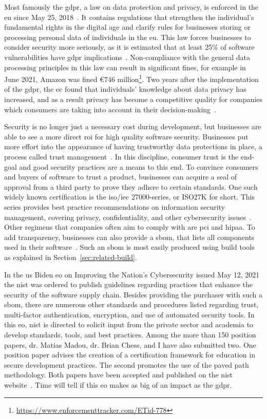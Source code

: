 Most famously the \gls{gdpr}, a law on data protection and privacy, is enforced in the \gls{eu} since May 25, 2018~\cite{gdpr}.
It contains regulations that strengthen the individual's fundamental rights in the digital age and clarify rules for businesses storing or processing personal data of individuals in the \gls{eu}.
This law forces businesses to consider security more seriously, as it is estimated that at least 25\% of software vulnerabilities have \gls{gdpr} implications~\cite{gdprhackerone}.
Non-compliance with the general data processing principles in this law can result in significant fines, for example in June 2021, Amazon was fined €746 million\footnote{\url{https://www.enforcementtracker.com/ETid-778}}.
Two years after the implementation of the \gls{gdpr}, the \gls{ec} found that individuals' knowledge about data privacy has increased, and as a result privacy has become a competitive quality for companies which consumers are taking into account in their decision-making~\cite{gdprfra}.

Security is no longer just a necessary cost during development, but businesses are able to see a more direct \gls{roi} for high quality software security.
Businesses put more effort into the appearance of having trustworthy data protections in place, a process called trust management~\cite{cassandra2021analysis, ashraf2020role}.
In this discipline, consumer trust is the end-goal and good security practices are a means to this end.
To convince consumers and buyers of software to trust a product, businesses can acquire a seal of approval from a third party to prove they adhere to certain standards.
One such widely known certification is the \gls{iso}/\gls{iec} 27000-series, or ISO27K for short.
This series provides best practice recommendations on information security management, covering privacy, confidentiality, and other cybersecurity issues~\cite{iso27k}.
Other regimens that companies often aim to comply with are \gls{pci} and \gls{hipaa}.
To add transparency, businesses can also provide a \gls{sbom}, that lists all components used in their software~\cite{sbomntia}.
Such an \gls{sbom} is most easily produced using build tools as explained in Section~\ref{sec:related-build}.

In the \gls{us} Biden \gls{eo} on Improving the Nation's Cybersecurity issued May 12, 2021 the \gls{nist} was ordered to publish guidelines regarding practices that enhance the security of the software supply chain.
Besides providing the purchaser with such a \gls{sbom}, there are numerous other standards and procedures listed regarding trust, multi-factor authentication, encryption, and use of automated security tools.
In this \gls{eo}, \gls{nist} is directed to solicit input from the private sector and academia to develop standards, tools, and best practices.
Among the more than 150 position papers, dr. Matias Madou, dr. Brian Chess, and I have also submitted two.
One position paper advises the creation of a certification framework for education in secure development practices.
The second promotes the use of the paved path methodology.
Both papers have been accepted and published on the \gls{nist} website~\cite{nist-enhancing}.
Time will tell if this \gls{eo} makes as big of an impact as the \gls{gdpr}.

